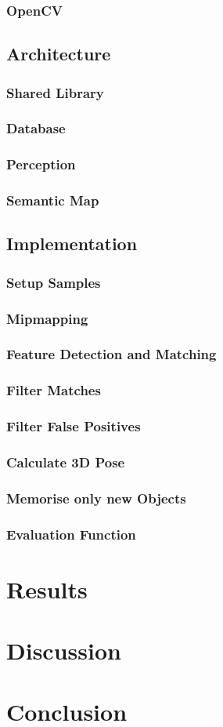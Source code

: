 \documentclass[11pt, twoside, a4paper]{report}
\begin{document}
\subsection{OpenCV}

\section{Architecture}
\subsection{Shared Library}
\subsection{Database}
\subsection{Perception}
\subsection{Semantic Map}

\section{Implementation}
\subsection{Setup Samples}
\subsection{Mipmapping}
\subsection{Feature Detection and Matching}
\subsection{Filter Matches}
\subsection{Filter False Positives}
\subsection{Calculate 3D Pose}
\subsection{Memorise only new Objects}
\subsection{Evaluation Function}


\chapter{Results}


\chapter{Discussion}


\chapter{Conclusion}
\end{document}
